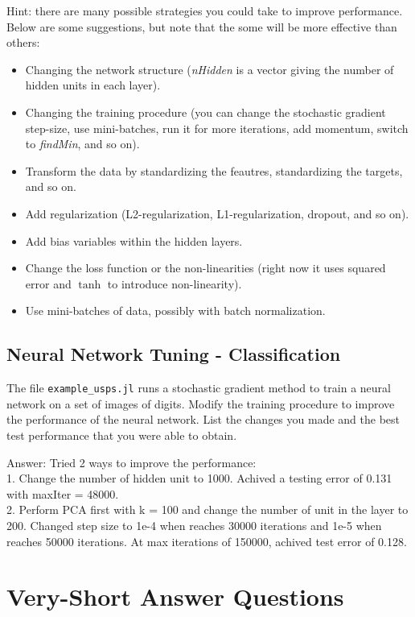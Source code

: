 \documentclass{article}
\def\ans#1{\par\gre{Answer: #1}}
\def\blu#1{{\color{blu}#1}}
\def\gre#1{{\color{gre}#1}}
\def\items#1{\begin{itemize}#1\end{itemize}}
\begin{document}
Hint: there are many possible strategies you could take to improve performance. Below are some suggestions, but note that the some will be more effective than others:
\items{
\item Changing the network structure (\emph{nHidden} is a vector giving the number of hidden units in each layer).
\item Changing the training procedure (you can change the stochastic gradient step-size, use mini-batches, run it for more iterations, add momentum, switch to \emph{findMin}, and so on).
\item Transform the data by standardizing the feautres, standardizing the targets, and so on.
\item Add regularization (L2-regularization, L1-regularization, dropout, and so on).
\item Add bias variables within the hidden layers.
\item Change the loss function or the non-linearities (right now it uses squared error and $\tanh$ to introduce non-linearity).
\item Use mini-batches of data, possibly with batch normalization.
}

\subsection{Neural Network Tuning - Classification}

The file \texttt{example\_usps.jl} runs a stochastic gradient method to train a neural network on a set of images of digits. Modify the training procedure to improve the performance of the neural network. \blu{List the changes you made and the best test performance that you were able to obtain}.
\ans{Tried 2 ways to improve the performance: 
\\1. Change the number of hidden unit to 1000. Achived a testing error of 0.131 with maxIter = 48000.
\\2. Perform PCA first with k = 100 and change the number of unit in the layer to 200. Changed step size to 1e-4 when reaches 30000 iterations and 1e-5 when reaches 50000 iterations. At max iterations of 150000, achived test error of 0.128.}

\section{Very-Short Answer Questions}
\end{document}
